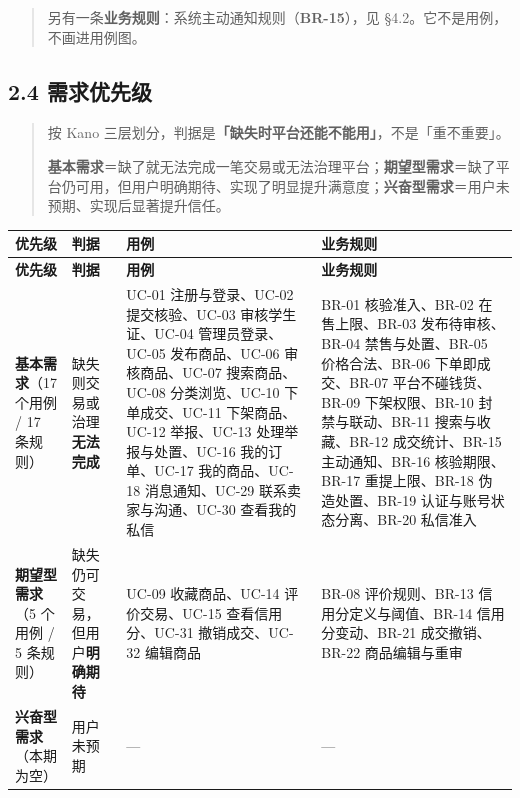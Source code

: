 \documentclass[12pt,a4paper]{ctexart}
\begin{document}
\begin{quote}\small
另有一条\textbf{业务规则}：系统主动通知规则（\textbf{BR-15}），见 §4.2。它不是用例，不画进用例图。

\end{quote}

\subsection*{2.4 需求优先级}

\begin{quote}\small
按 Kano 三层划分，判据是\textbf{「缺失时平台还能不能用」}，不是「重不重要」。

\textbf{基本需求}＝缺了就无法完成一笔交易或无法治理平台；\textbf{期望型需求}＝缺了平台仍可用，但用户明确期待、实现了明显提升满意度；\textbf{兴奋型需求}＝用户未预期、实现后显著提升信任。

\end{quote}

{\scriptsize
\begin{longtable}{|p{1.51cm}|p{1.51cm}|p{6.45cm}|p{6.54cm}|}
\hline
\textbf{优先级} & \textbf{判据} & \textbf{用例} & \textbf{业务规则} \\
\hline
\endfirsthead
\hline
\textbf{优先级} & \textbf{判据} & \textbf{用例} & \textbf{业务规则} \\
\hline
\endhead
\hline
\endfoot
\textbf{基本需求}（17 个用例 / 17 条规则） & 缺失则交易或治理\textbf{无法完成} & UC-01 注册与登录、UC-02 提交核验、UC-03 审核学生证、UC-04 管理员登录、UC-05 发布商品、UC-06 审核商品、UC-07 搜索商品、UC-08 分类浏览、UC-10 下单成交、UC-11 下架商品、UC-12 举报、UC-13 处理举报与处置、UC-16 我的订单、UC-17 我的商品、UC-18 消息通知、UC-29 联系卖家与沟通、UC-30 查看我的私信 & BR-01 核验准入、BR-02 在售上限、BR-03 发布待审核、BR-04 禁售与处置、BR-05 价格合法、BR-06 下单即成交、BR-07 平台不碰钱货、BR-09 下架权限、BR-10 封禁与联动、BR-11 搜索与收藏、BR-12 成交统计、BR-15 主动通知、BR-16 核验期限、BR-17 重提上限、BR-18 伪造处置、BR-19 认证与账号状态分离、BR-20 私信准入 \\
\hline
\textbf{期望型需求}（5 个用例 / 5 条规则） & 缺失仍可交易，但用户\textbf{明确期待} & UC-09 收藏商品、UC-14 评价交易、UC-15 查看信用分、UC-31 撤销成交、UC-32 编辑商品 & BR-08 评价规则、BR-13 信用分定义与阈值、BR-14 信用分变动、BR-21 成交撤销、BR-22 商品编辑与重审 \\
\hline
\textbf{兴奋型需求}（本期为空） & 用户未预期 & — & — \\
\hline
\end{longtable}
}
\end{document}
